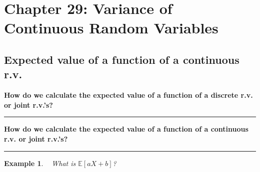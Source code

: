 \documentclass[12pt]{amsart}
\newtheorem{example}[theorem]{Example}
\newcommand\Ebb{\mathbb{E}}
\begin{document}
\setcounter{section}{29}
{\huge  
\section*{Chapter 29: Variance of \newline Continuous Random Variables}
}

{\large %




\vspace{.5cm}

\subsection{Expected value of a function of a continuous r.v.}\hspace*{\fill}%

\vspace{.5cm}

\textbf{How do we calculate the expected value of a function of a discrete r.v. or joint r.v.'s?}


\vspace{5cm}
\hrule
\vspace{.5cm}



\textbf{How do we calculate the expected value of a function of a continuous r.v. or joint r.v.'s?}


\vspace{5cm}
\hrule
\vspace{.5cm}



\begin{example}\label{29_EaX+b}\ %
What is $\Ebb[aX+b]$?


\end{example}}
\end{document}
